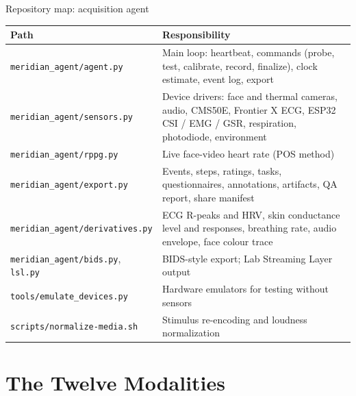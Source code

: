 \documentclass[aspectratio=169,11pt]{beamer}
\newcommand{\code}[1]{{\small\texttt{#1}}}
\begin{document}
\begin{frame}{Repository map: acquisition agent}
  \footnotesize
  \begin{tabularx}{\textwidth}{@{}l X@{}}
    \toprule
    \textbf{Path} & \textbf{Responsibility} \\
    \midrule
    \code{meridian\_agent/agent.py} & Main loop: heartbeat, commands (probe, test, calibrate, record, finalize), clock estimate, event log, export \\
    \code{meridian\_agent/sensors.py} & Device drivers: face and thermal cameras, audio, CMS50E, Frontier X ECG, ESP32 CSI / EMG / GSR, respiration, photodiode, environment \\
    \code{meridian\_agent/rppg.py} & Live face-video heart rate (POS method) \\
    \code{meridian\_agent/export.py} & Events, steps, ratings, tasks, questionnaires, annotations, artifacts, QA report, share manifest \\
    \code{meridian\_agent/derivatives.py} & ECG R-peaks and HRV, skin conductance level and responses, breathing rate, audio envelope, face colour trace \\
    \code{meridian\_agent/bids.py}, \code{lsl.py} & BIDS-style export; Lab Streaming Layer output \\
    \code{tools/emulate\_devices.py} & Hardware emulators for testing without sensors \\
    \code{scripts/normalize-media.sh} & Stimulus re-encoding and loudness normalization \\
    \bottomrule
  \end{tabularx}
\end{frame}

\section{The Twelve Modalities}
\end{document}

